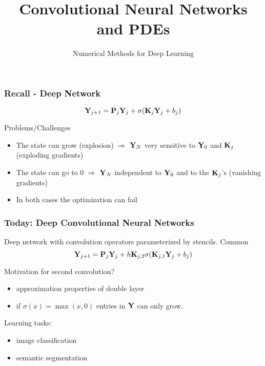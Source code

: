 \documentclass[12pt,fleqn,handout]{beamer}
\date{}
\title[CNN+PDE]{Convolutional Neural Networks and PDEs}
\subtitle{Numerical Methods for Deep Learning}
\begin{document}
\makebeamertitle

\begin{frame}[fragile]\frametitle{Recall - Deep Network}

$$ {\bf Y}_{j+1} = {\bf P}_j{\bf Y}_j +  \sigma({\bf K}_j {\bf Y}_j + b_j) $$

\bigskip
\pause

Problems/Challenges

\begin{itemize}
\item
The state can grow (explosion) $\Rightarrow$ ${\bf Y}_N$  very sensitive to ${\bf Y}_0$ and ${\bf K}_j$
(exploding gradients)
\pause
\item
The state can go to $0$ $\Rightarrow$ ${\bf Y}_N$ independent to  ${\bf Y}_0$ and to the ${\bf K}_j$'s
(vanishing gradients)
\item
In both cases the optimization can fail
\end{itemize}

\end{frame}

\begin{frame}
	\frametitle{Today: Deep Convolutional Neural Networks}
	
	Deep network with convolution operators parameterized by stencils. Common
	$$ {\bf Y}_{j+1} = {\bf P}_j{\bf Y}_j +  h {\bf K}_{j,2}\sigma({\bf K}_{j,1} {\bf Y}_j + b_j) $$
	
	\bigskip
	\pause
	
	Motivation for second convolution?
	\begin{itemize}
		\item approximation properties of double layer
		\item if $\sigma(x)=\max(x,0)$ entries in ${\bf Y}$ can only grow.
	\end{itemize}
	
	\bigskip
	\pause
	
	Learning tasks:
	\begin{itemize}
		\item image classification
		\item semantic segmentation
	\end{itemize}
	
	
	
\end{frame}
\end{document}
